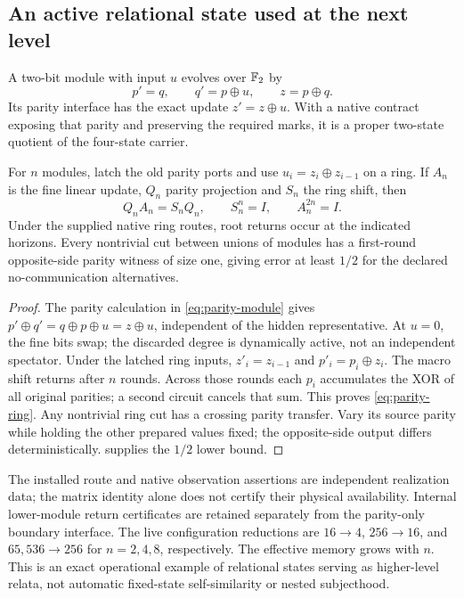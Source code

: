 \subsection{An active relational state used at the next level}
\begin{proposition}\label{p2-35}
A two-bit module with input \(u\) evolves over \(\mathbb F_2\) by
\begin{equation}\label{eq:parity-module}
 p'=q,\qquad q'=p\oplus u,\qquad z=p\oplus q.
\end{equation}
Its parity interface has the exact update \(z'=z\oplus u\). With a native contract exposing that parity and preserving the required marks, it is a proper two-state quotient of the four-state carrier.

For \(n\) modules, latch the old parity ports and use \(u_i=z_i\oplus z_{i-1}\) on a ring. If \(A_n\) is the fine linear update, \(Q_n\) parity projection and \(S_n\) the ring shift, then
\begin{equation}\label{eq:parity-ring}
 Q_nA_n=S_nQ_n,\qquad S_n^n=I,\qquad A_n^{2n}=I.
\end{equation}
Under the supplied native ring routes, root returns occur at the indicated horizons. Every nontrivial cut between unions of modules has a first-round opposite-side parity witness of size one, giving error at least \(1/2\) for the declared no-communication alternatives.
\end{proposition}
\begin{proof}
The parity calculation in \cref{eq:parity-module} gives
\(p'\oplus q'=q\oplus p\oplus u=z\oplus u\), independent of the hidden representative. At \(u=0\), the fine bits swap; the discarded degree is dynamically active, not an independent spectator. Under the latched ring inputs, \(z'_i=z_{i-1}\) and \(p'_i=p_i\oplus z_i\). The macro shift returns after \(n\) rounds. Across those rounds each \(p_i\) accumulates the XOR of all original parities; a second circuit cancels that sum. This proves \cref{eq:parity-ring}. Any nontrivial ring cut has a crossing parity transfer. Vary its source parity while holding the other prepared values fixed; the opposite-side output differs deterministically.  supplies the \(1/2\) lower bound.
\end{proof}
The installed route and native observation assertions are independent realization data; the matrix identity alone does not certify their physical availability. Internal lower-module return certificates are retained separately from the parity-only boundary interface. The live configuration reductions are \(16\to4\), \(256\to16\), and \(65{,}536\to256\) for \(n=2,4,8\), respectively. The effective memory grows with \(n\). This is an exact operational example of relational states serving as higher-level relata, not automatic fixed-state self-similarity or nested subjecthood.

